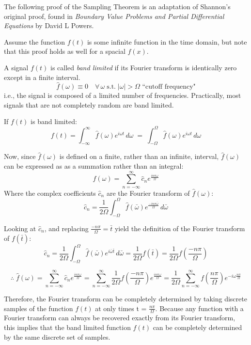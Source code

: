 \documentclass[12pt]{article}
\newcommand{\inftyint}{\int_{-\infty}^{\infty}}
\begin{document}
The following proof of the Sampling Theorem is an adaptation of Shannon's original
proof, found in \emph{Boundary Value Problems and Partial Differential 
Equations} by David L Powers.

Assume the function \(f(t)\) is some infinite function in the time domain, but note that
this proof holds as well for a spacial \(f(x)\).

A signal \(f(t)\) is called \emph{band limited} if its Fourier transform is
identically zero except in a finite interval.  \[\hat{f}(\omega) \equiv 0 \quad
\forall \, \omega \; \text{s.t.} \; |\omega| > \Omega \text{ ``cutoff
frequency"}\] i.e., the signal is composed of a limited number of frequencies.
Practically, most signals that are not completely random are band limited.

If \(f(t)\) is band limited: \begin{equation} \label{eq:nft} f(t) = \inftyint
    \hat{f}(\omega)e^{i\omega t} \,d\omega \; = \; \int_{-\Omega}^{\Omega}
    \hat{f}(\omega)e^{i\omega t} \,d\omega \end{equation}

Now, since \( \hat{f}(\omega) \) is defined on a finite, rather than an
infinite, interval, \( \hat{f}(\omega) \) can be expressed as as a summation
rather than an integral: \[\hat{f}(\omega) = \sum_{n = -\infty}^{\infty}
\hat{c}_{n}e^{\frac{i n \pi \omega}{\Omega}} \] Where the complex coefficients
\( \hat{c}_n\) are the Fourier transform of \( \hat{f}(\omega) \): \[\hat{ c}_n
= \frac{1}{2\Omega} \int_{-\Omega}^{\Omega} \hat{f}(\bar{\omega})e^{\frac{-i n
\pi \bar{ \omega}}{\Omega}}\,d\bar{\omega}\]

Looking at \(\hat{c}_n\), and replacing \( \frac{-n\pi}{\Omega} = \bar{t}\)
yield the definition of the Fourier transform of \( f(\bar{t})\): \[ \hat{c}_n
= \frac{1}{2\Omega} \int_{-\Omega}^{\Omega}
\hat{f}(\bar{\omega})e^{i\bar{\omega}\bar{t}}\,d\bar{\omega} =
\frac{1}{2\Omega} f(\bar{t}) = \frac{1}{2\Omega} f(\frac{-n\pi}{\Omega})\]

\begin{equation} \label{eq:nfhat} \therefore \; \hat{f}(\omega) = \sum_{n =
    -\infty}^{\infty} \hat{c}_{n}e^{\frac{i n \pi \omega}{\Omega}} = \sum_{n =
    -\infty}^{\infty} \frac{1}{2\Omega} f(\frac{-n\pi}{\Omega})e^{\frac{i n \pi
    \omega}{\Omega}} = \frac{1}{2\Omega} \sum_{n = -\infty}^{\infty}
    f(\frac{n\pi}{\Omega})e^{-i \omega \frac{n \pi}{\Omega} } 
\end{equation}

Therefore, the Fourier transform can be completely determined by taking
discrete samples of the function \( f(t) \) at only times t = \(
\frac{n\pi}{\Omega}\). Because any function with a Fourier transform can 
always be recovered exactly from its Fourier transform, this implies that the 
band limited function \( f(t)\) can be completely determined by the same 
discrete set of samples.
\end{document}
